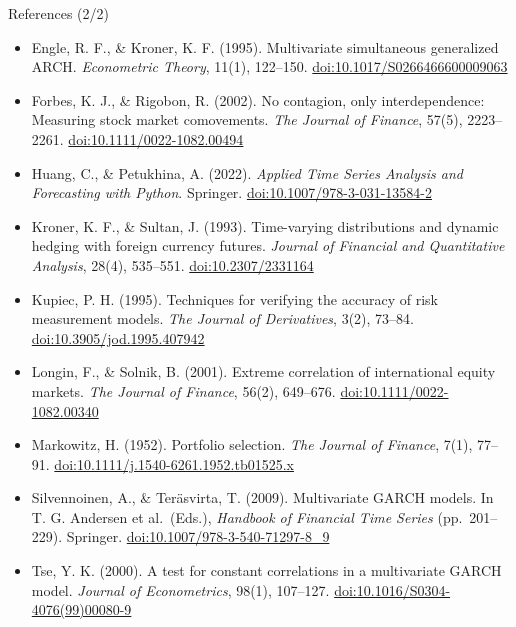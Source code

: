 \begin{frame}{References (2/2)}
\itemsize{\scriptsize}
\begin{itemize}
    \item Engle, R. F., \& Kroner, K. F. (1995). Multivariate simultaneous generalized ARCH. \textit{Econometric Theory}, 11(1), 122--150. \href{https://doi.org/10.1017/S0266466600009063}{doi:10.1017/S0266466600009063}
    \item Forbes, K. J., \& Rigobon, R. (2002). No contagion, only interdependence: Measuring stock market comovements. \textit{The Journal of Finance}, 57(5), 2223--2261. \href{https://doi.org/10.1111/0022-1082.00494}{doi:10.1111/0022-1082.00494}
    \item Huang, C., \& Petukhina, A. (2022). \textit{Applied Time Series Analysis and Forecasting with Python}. Springer. \href{https://doi.org/10.1007/978-3-031-13584-2}{doi:10.1007/978-3-031-13584-2}
    \item Kroner, K. F., \& Sultan, J. (1993). Time-varying distributions and dynamic hedging with foreign currency futures. \textit{Journal of Financial and Quantitative Analysis}, 28(4), 535--551. \href{https://doi.org/10.2307/2331164}{doi:10.2307/2331164}
    \item Kupiec, P. H. (1995). Techniques for verifying the accuracy of risk measurement models. \textit{The Journal of Derivatives}, 3(2), 73--84. \href{https://doi.org/10.3905/jod.1995.407942}{doi:10.3905/jod.1995.407942}
    \item Longin, F., \& Solnik, B. (2001). Extreme correlation of international equity markets. \textit{The Journal of Finance}, 56(2), 649--676. \href{https://doi.org/10.1111/0022-1082.00340}{doi:10.1111/0022-1082.00340}
    \item Markowitz, H. (1952). Portfolio selection. \textit{The Journal of Finance}, 7(1), 77--91. \href{https://doi.org/10.1111/j.1540-6261.1952.tb01525.x}{doi:10.1111/j.1540-6261.1952.tb01525.x}
    \item Silvennoinen, A., \& Teräsvirta, T. (2009). Multivariate GARCH models. In T. G. Andersen et al.\ (Eds.), \textit{Handbook of Financial Time Series} (pp.~201--229). Springer. \href{https://doi.org/10.1007/978-3-540-71297-8_9}{doi:10.1007/978-3-540-71297-8\_9}
    \item Tse, Y. K. (2000). A test for constant correlations in a multivariate GARCH model. \textit{Journal of Econometrics}, 98(1), 107--127. \href{https://doi.org/10.1016/S0304-4076(99)00080-9}{doi:10.1016/S0304-4076(99)00080-9}
\end{itemize}
\end{frame}


